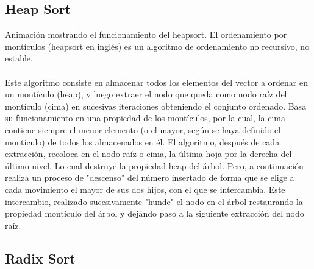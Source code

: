\documentclass[a4paper]{article} %
\begin{document}
		\subsection*{Heap Sort}
		Animación mostrando el funcionamiento del heapsort.
		El ordenamiento por montículos (heapsort en inglés) es un algoritmo de ordenamiento no recursivo, no estable.\\ \\
		Este algoritmo consiste en almacenar todos los elementos del vector a ordenar en un montículo (heap), y luego extraer el nodo que queda como nodo raíz del montículo (cima) en sucesivas iteraciones obteniendo el conjunto ordenado. Basa su funcionamiento en una propiedad de los montículos, por la cual, la cima contiene siempre el menor elemento (o el mayor, según se haya definido el montículo) de todos los almacenados en él. El algoritmo, después de cada extracción, recoloca en el nodo raíz o cima, la última hoja por la derecha del último nivel. Lo cual destruye la propiedad heap del árbol. Pero, a continuación realiza un proceso de "descenso" del número insertado de forma que se elige a cada movimiento el mayor de sus dos hijos, con el que se intercambia. Este intercambio, realizado sucesivamente "hunde" el nodo en el árbol restaurando la propiedad montículo del árbol y dejándo paso a la siguiente extracción del nodo raíz.	
		
		\afterpage{\newpage}
		\newpage		

		\subsection*{Radix Sort}
		
\end{document}
